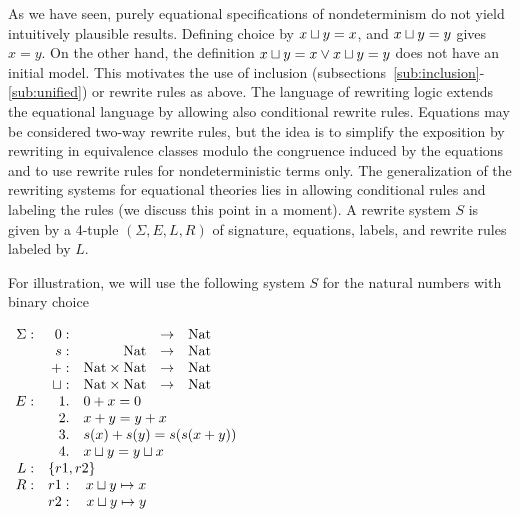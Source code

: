 {As we have seen, purely equational specifications of nondeterminism do not yield intuitively plausible 
results. Defining choice by $x\sqcup y=x$, and $x\sqcup y=y$ gives $x=y$. On the other hand, 
the definition $x\sqcup y=x \lor x\sqcup y=y$ 
does not have an initial model. This motivates the use of inclusion 
(subsections~\ref{sub:inclusion}-\ref{sub:unified}) or rewrite rules as above. The 
language of rewriting logic extends the equational language by allowing also conditional rewrite rules. 
Equations may be considered two-way rewrite rules, but the idea is to simplify the exposition by rewriting 
in equivalence classes modulo the congruence induced by the equations and to use rewrite rules for 
nondeterministic terms only. The generalization of the rewriting systems for equational theories lies in 
allowing conditional rules and labeling the rules (we discuss this point in a moment). 
A rewrite system $S$ is 
given by a 4-tuple $(\Sigma, E, L, R)$ of signature, equations, labels, and rewrite rules labeled by $L$.
\begin{Example}\label{ex:RL} 
For illustration, we will use the following system $S$ for the natural numbers with binary choice 

$ \begin{array}{rrrcl}
 \Sigma: & 0: & & \into & \Nat \\
        & s: & \Nat & \into & \Nat\\
        & +: & \Nat\times\Nat & \into & \Nat\\
        & \ch : & \Nat\times\Nat & \into & \Nat \\
E:   & 1. & \multicolumn{3}{l}{0+x = 0} \\
     & 2. & \multicolumn{3}{l}{x+y = y+x} \\
     & 3.  & \multicolumn{3}{l}{s(x)+s(y) = s(s(x+y))} \\
     & 4. & \multicolumn{3}{l}{x\ch y = y\ch x} \\
L:  & \multicolumn{4}{l}{\{ r1, r2 \} } \\
R: &	r1: & x\ch y \rew x	 \\
   & 	r2: & x\ch y \rew y
\end{array} $
\end{Example}

}
